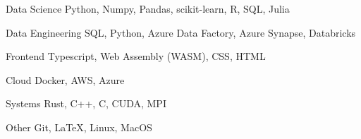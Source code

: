 
\begin{cvskills}

\cvskill
  {Data Science} %
  {Python, Numpy, Pandas, scikit-learn, R, SQL, Julia}

\cvskill
  {Data Engineering} %
  {SQL, Python, Azure Data Factory, Azure Synapse, Databricks}


\cvskill
  {Frontend} %
  {Typescript, Web Assembly (WASM), CSS, HTML}

\cvskill
  {Cloud} %
  {Docker, AWS, Azure}

\cvskill
  {Systems} %
  {Rust, C++, C, CUDA, MPI}

\cvskill
  {Other} %
  {Git, \LaTeX, Linux, MacOS}

\end{cvskills}
